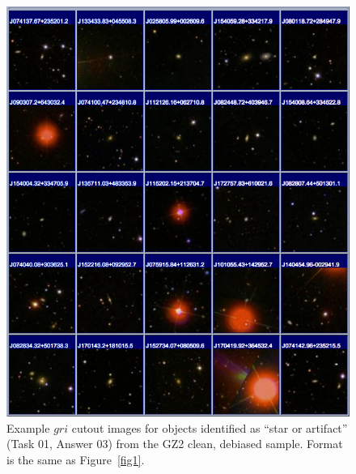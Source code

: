 \documentclass[useAMS,usenatbib]{mn2e}
\begin{document}
\newpage
\clearpage
\begin{figure}
\includegraphics[angle=0,width=7.0in]{figures/gallery/artifact.png}
\caption{Example $gri$ cutout images for objects identified as ``star or artifact'' (Task 01, Answer 03) from the GZ2 clean, debiased sample. Format is the same as Figure~\ref{fig1}.}
\end{figure}
\end{document}
